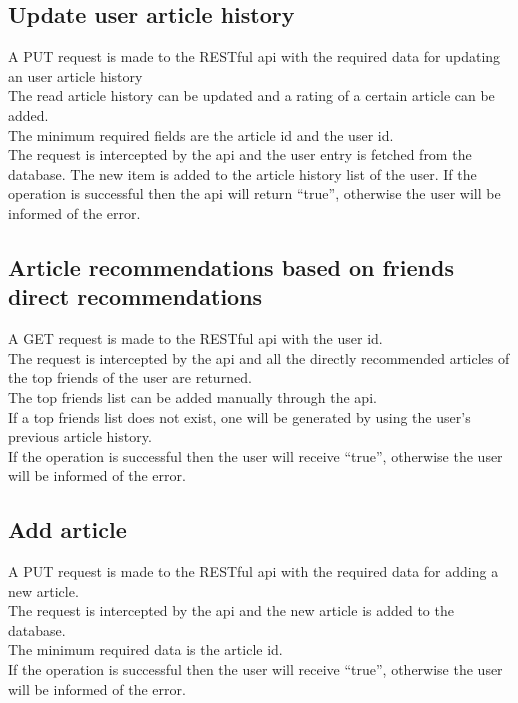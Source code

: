 \subsection{Update user article history}
\label{sec:workflow-update-user-article-history}
A PUT request is made to the RESTful api with the required data for updating an user article history
\\ The read article history can be updated and a rating of a certain article can be added. 
\\ The minimum required fields are the article id and the user id.
\\ The request is intercepted by the api and the user entry is fetched from the database. The new item is added to the article history list of the user. If the operation is successful then the api will return “true”, otherwise the user will be informed of the error. 


\subsection{Article recommendations based on friends direct recommendations}
\label{sec:workflow-friends-direct-recommendations}
A GET request is made to the RESTful api with the user id.
\\ The request is intercepted by the api and all the directly recommended articles of the top friends of the user are returned.
\\ The top friends list can be added manually through the api.
\\ If a top friends list does not exist, one will be generated by using the user’s previous article history.
\\ If the operation is successful then the user will receive “true”, otherwise the user will be informed of the error. 

\subsection{Add article}
\label{sec:workflow-add-article}
A PUT request is made to the RESTful api with the required data for adding a new article.
\\ The request is intercepted by the api and the new article is added to the database.
\\ The minimum required data is the article id.
\\ If the operation is successful then the user will receive “true”, otherwise the user will be informed of the error.


